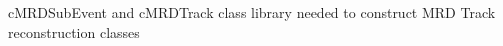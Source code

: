 c\-M\-R\-D\-Sub\-Event and c\-M\-R\-D\-Track class library needed to construct M\-R\-D Track reconstruction classes 